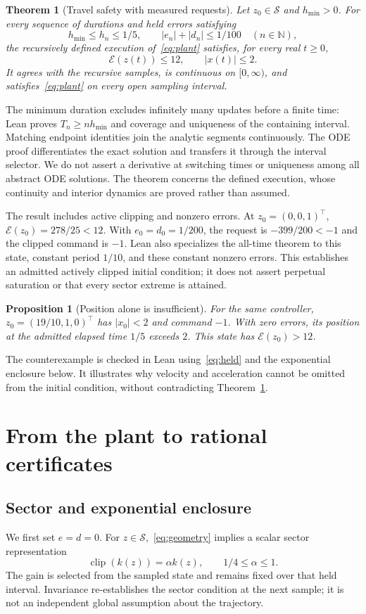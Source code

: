 \documentclass[10pt]{article}
\newtheorem{theorem}{Theorem}
\newtheorem{proposition}{Proposition}
\newcommand{\E}{\mathcal E}
\newcommand{\clip}{\operatorname{clip}}
\begin{document}
\begin{theorem}[Travel safety with measured requests]\label{thm:main}
Let $z_0\in\mathcal S$ and $h_{\min}>0$. For every sequence of durations and held errors satisfying
\[
 h_{\min}\le h_n\le1/5,\qquad |e_n|+|d_n|\le1/100\quad(n\in\mathbb N),
\]
the recursively defined execution of~\eqref{eq:plant} satisfies, for every real $t\ge0$,
\[
 \E(z(t))\le12,\qquad |x(t)|\le2.
\]
It agrees with the recursive samples, is continuous on $[0,\infty)$, and satisfies~\eqref{eq:plant} on every open sampling interval.
\end{theorem}
The minimum duration excludes infinitely many updates before a finite time: Lean proves $T_n\ge nh_{\min}$ and coverage and uniqueness of the containing interval. Matching endpoint identities join the analytic segments continuously. The ODE proof differentiates the exact solution and transfers it through the interval selector. We do not assert a derivative at switching times or uniqueness among all abstract ODE solutions. The theorem concerns the defined execution, whose continuity and interior dynamics are proved rather than assumed.

The result includes active clipping and nonzero errors. At $z_0=(0,0,1)^\top$, $\E(z_0)=278/25<12$. With $e_0=d_0=1/200$, the request is $-399/200<-1$ and the clipped command is $-1$. Lean also specializes the all-time theorem to this state, constant period $1/10$, and these constant nonzero errors. This establishes an admitted actively clipped initial condition; it does not assert perpetual saturation or that every sector extreme is attained.

\begin{proposition}[Position alone is insufficient]\label{prop:escape}
For the same controller, $z_0=(19/10,1,0)^\top$ has $|x_0|<2$ and command $-1$. With zero errors, its position at the admitted elapsed time $1/5$ exceeds $2$. This state has $\E(z_0)>12$.
\end{proposition}
The counterexample is checked in Lean using~\eqref{eq:held} and the exponential enclosure below. It illustrates why velocity and acceleration cannot be omitted from the initial condition, without contradicting Theorem~\ref{thm:main}.

\section{From the plant to rational certificates}
\subsection{Sector and exponential enclosure}
We first set $e=d=0$. For $z\in\mathcal S$,~\eqref{eq:geometry} implies a scalar sector representation
\[
 \clip(k(z))=\alpha k(z),\qquad 1/4\le\alpha\le1.
\]
The gain is selected from the sampled state and remains fixed over that held interval. Invariance re-establishes the sector condition at the next sample; it is not an independent global assumption about the trajectory.
\end{document}
